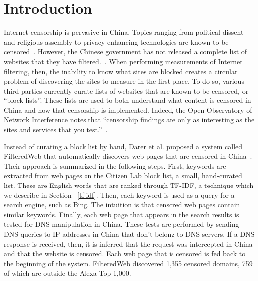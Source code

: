 
\section{Introduction} 

Internet censorship is pervasive in China. Topics ranging from
political dissent and religious assembly to privacy-enhancing
technologies are known to be
censored~\cite{citizenlab:block}. However, the Chinese government has
not released a complete list of websites that they have
filtered.~\cite{fhouse:china}. When performing measurements of
Internet filtering, then, the inability to know what sites are blocked
creates a circular problem of discovering the sites to measure in the
first place. To do so, various third parties currently curate lists of
websites that are known to be censored, or ``block lists''. These
lists are used to both understand {what} content is censored in China
and how that censorship is implemented. Indeed, the Open Observatory
of Network Interference notes that ``censorship findings are only as
interesting as the sites and services that you
test.''~\cite{ooni:lists}.

Instead of curating a block list by hand, Darer et al. proposed a
system called FilteredWeb that automatically discovers web pages that
are censored in China~\cite{darer2017filteredweb}. Their approach is
summarized in the following steps. First, keywords are extracted from
web pages on the Citizen Lab block list, a small, hand-curated
list. These are English words that are ranked through TF-IDF, a
technique which we describe in Section ~\ref{tf-idf}. Then, each
keyword is used as a query for a search engine, such as Bing. The
intuition is that censored web pages contain similar keywords. Finally,
each web page that appears in the search results is tested for DNS
manipulation in China. These tests are performed by sending DNS
queries to IP addresses in China that don't belong to DNS servers. If
a DNS response is received, then, it is inferred that the request was
intercepted in China and that the website is censored. Each
web page that is censored is fed back to the beginning of the
system. FilteredWeb discovered 1,355 censored domains, 759 of which
are outside the Alexa Top 1,000.

